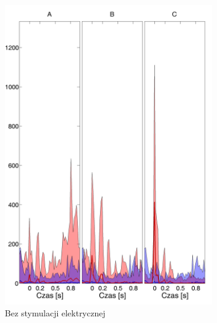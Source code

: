 \documentclass{pracamgr_2}
\begin{document}
	\begin{figure}[h]
		\begin{subfigure}{.5\textwidth}
			\centering
			\includegraphics[width=1.\linewidth]{kontrola15_10-30_z_SC6_do_CxC102.png}
			\caption{Bez stymulacji elektrycznej}
			\label{rys:10_30_kon_SC_CxC}
		\end{subfigure}%
		\begin{subfigure}{.5\textwidth}
			\centering

\end{subfigure}
\end{figure}
\end{document}
